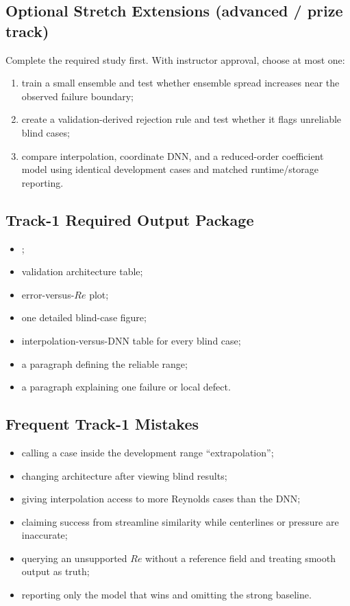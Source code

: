 \documentclass[11pt]{article}
\newcommand{\file}[1]{\path{#1}}
\begin{document}
\subsection{Optional Stretch Extensions (advanced / prize track)}
Complete the required study first. With instructor approval, choose at most one:
\begin{enumerate}
\item train a small ensemble and test whether ensemble spread increases near the observed failure boundary;
\item create a validation-derived rejection rule and test whether it flags unreliable blind cases;
\item compare interpolation, coordinate DNN, and a reduced-order coefficient model using identical development cases and matched runtime/storage reporting.
\end{enumerate}

\subsection{Track-1 Required Output Package}
\begin{itemize}
\item \file{P1_results.csv};
\item validation architecture table;
\item error-versus-$Re$ plot;
\item one detailed blind-case figure;
\item interpolation-versus-DNN table for every blind case;
\item a paragraph defining the reliable range;
\item a paragraph explaining one failure or local defect.
\end{itemize}

\subsection{Frequent Track-1 Mistakes}
\begin{itemize}
\item calling a case inside the development range ``extrapolation'';
\item changing architecture after viewing blind results;
\item giving interpolation access to more Reynolds cases than the DNN;
\item claiming success from streamline similarity while centerlines or pressure are inaccurate;
\item querying an unsupported $Re$ without a reference field and treating smooth output as truth;
\item reporting only the model that wins and omitting the strong baseline.
\end{itemize}
\end{document}
